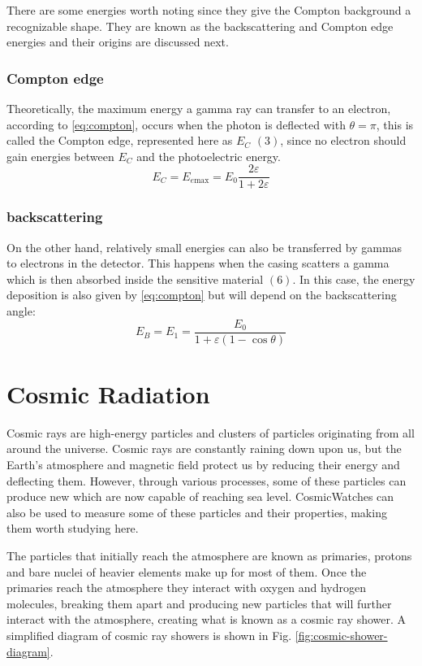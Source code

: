 There are some energies worth noting since they give the Compton background a recognizable shape. They are known as the backscattering and Compton edge energies and their origins are discussed next.

\subsubsection{Compton edge}

Theoretically, the maximum energy a gamma ray can transfer to an electron, according to \eqref{eq:compton}, occurs when the photon is deflected with $\theta=\pi$, this is called the Compton edge, represented here as $E_C$ $(3)$, since no electron should gain energies between $E_C$ and the photoelectric energy.
\begin{equation}
  E_C=E_{e\text{max}}=E_0\frac{2\varepsilon}{1+2\varepsilon}
\end{equation}

\subsubsection{backscattering}
On the other hand, relatively small energies can also be transferred by gammas to electrons in the detector. This happens when the casing scatters a gamma which is then absorbed inside the sensitive material $(6)$. In this case, the energy deposition is also given by \eqref{eq:compton} but will depend on the backscattering angle:
\begin{equation}
    E_B=E_1=\frac{E_0}{1+\varepsilon(1-\cos\theta)}
\end{equation}

\section{Cosmic Radiation}

Cosmic rays are high-energy particles and clusters of particles originating from all around the universe. Cosmic rays are constantly raining down upon us, but the Earth's atmosphere and magnetic field protect us by reducing their energy and deflecting them. However, through various processes, some of these particles can produce new which are now capable of reaching sea level. CosmicWatches can also be used to measure some of these particles and their properties, making them worth studying here.

The particles that initially reach the atmosphere are known as primaries, protons and bare nuclei of heavier elements make up for most of them. Once the primaries reach the atmosphere they interact with oxygen and hydrogen molecules, breaking them apart and producing new particles that will further interact with the atmosphere, creating what is known as a cosmic ray shower. A simplified diagram of cosmic ray showers is shown in Fig. \ref{fig:cosmic-shower-diagram}.

